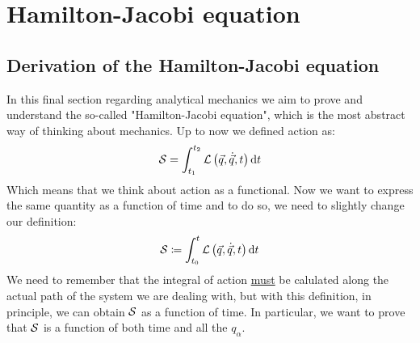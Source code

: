 \chapter{Hamilton-Jacobi equation}
\section{Derivation of the Hamilton-Jacobi equation}
In this final section regarding analytical mechanics we aim to prove and understand the so-called "Hamilton-Jacobi equation", which is the most abstract way of thinking about mechanics. Up to now we defined action as:
\begin{equation}
  \mathcal{S} = \int_{t_1}^{t_2}\mathcal{L}\left(\vec{q},\dot{\vec{q}},t\right) \dd{t}
\end{equation}
Which means that we think about action as a functional. Now we want to express the same quantity as a function of time and to do so, we need to slightly change our definition:
\begin{equation}
  \mathcal{S} \coloneqq \int_{t_0}^{t}\mathcal{L}\left(\vec{q},\dot{\vec{q}},t\right) \dd{t}
\end{equation}
We need to remember that the integral of action \underline{must} be calulated along the actual path of the system we are dealing with, but with this definition, in principle, we can obtain $\mathcal{S}$ as a function of time. In particular, we want to prove that $\mathcal{S}$ is a function of both time and all the $q_{\alpha}$.
